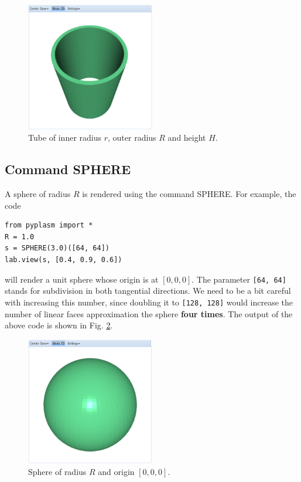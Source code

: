 \documentclass{article}
\begin{document}
\begin{figure}[!ht]
\begin{center}
\includegraphics[width=0.5\textwidth]{img/tube-1.png}
\end{center}
\vspace{-2mm}
\caption{Tube of inner radius $r$, outer radius $R$ and height $H$.}
\label{fig:tube-1}
\end{figure}

\subsection{Command SPHERE}

A sphere of radius $R$ is rendered using the command SPHERE.
For example, the code

\begin{verbatim}
from pyplasm import *
R = 1.0
s = SPHERE(3.0)([64, 64])
lab.view(s, [0.4, 0.9, 0.6])
\end{verbatim}
will render a unit sphere whose origin is at $[0, 0, 0]$. 
The parameter {\tt [64, 64]} stands for 
subdivision in both tangential directions. We need to be a bit 
careful with increasing this number, since doubling it to 
{\tt [128, 128]} would increase 
the number of linear faces approximation the sphere {\bf four times}.
The output of the above code is shown in Fig. \ref{fig:sphere-1}.

\newpage

\begin{figure}[!ht]
\begin{center}
\includegraphics[width=0.5\textwidth]{img/sphere-1.png}
\end{center}
\vspace{-2mm}
\caption{Sphere of radius $R$ and origin $[0, 0, 0]$.}
\label{fig:sphere-1}
\end{figure}
\end{document}

